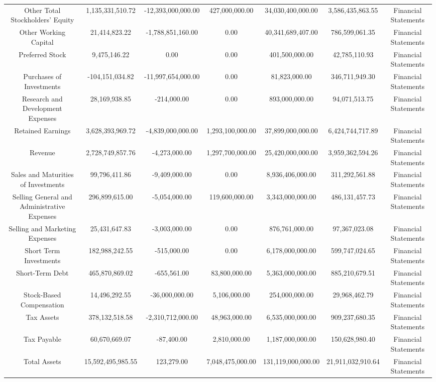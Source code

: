 \begin{longtable}{ccccccc}
Other Total Stockholders' Equity & 1,135,331,510.72 & -12,393,000,000.00 & 427,000,000.00 & 34,030,400,000.00 & 3,586,435,863.55 & Financial Statements \\
Other Working Capital & 21,414,823.22 & -1,788,851,160.00 & 0.00 & 40,341,689,407.00 & 786,599,061.35 & Financial Statements \\
Preferred Stock & 9,475,146.22 & 0.00 & 0.00 & 401,500,000.00 & 42,785,110.93 & Financial Statements \\
Purchases of Investments & -104,151,034.82 & -11,997,654,000.00 & 0.00 & 81,823,000.00 & 346,711,949.30 & Financial Statements \\
Research and Development Expenses & 28,169,938.85 & -214,000.00 & 0.00 & 893,000,000.00 & 94,071,513.75 & Financial Statements \\
Retained Earnings & 3,628,393,969.72 & -4,839,000,000.00 & 1,293,100,000.00 & 37,899,000,000.00 & 6,424,744,717.89 & Financial Statements \\
Revenue & 2,728,749,857.76 & -4,273,000.00 & 1,297,700,000.00 & 25,420,000,000.00 & 3,959,362,594.26 & Financial Statements \\
Sales and Maturities of Investments & 99,796,411.86 & -9,409,000.00 & 0.00 & 8,936,406,000.00 & 311,292,561.88 & Financial Statements \\
Selling General and Administrative Expenses & 296,899,615.00 & -5,054,000.00 & 119,600,000.00 & 3,343,000,000.00 & 486,131,457.73 & Financial Statements \\
Selling and Marketing Expenses & 25,431,647.83 & -3,003,000.00 & 0.00 & 876,761,000.00 & 97,367,023.08 & Financial Statements \\
Short Term Investments & 182,988,242.55 & -515,000.00 & 0.00 & 6,178,000,000.00 & 599,747,024.65 & Financial Statements \\
Short-Term Debt & 465,870,869.02 & -655,561.00 & 83,800,000.00 & 5,363,000,000.00 & 885,210,679.51 & Financial Statements \\
Stock-Based Compensation & 14,496,292.55 & -36,000,000.00 & 5,106,000.00 & 254,000,000.00 & 29,968,462.79 & Financial Statements \\
Tax Assets & 378,132,518.58 & -2,310,712,000.00 & 48,963,000.00 & 6,535,000,000.00 & 909,237,680.35 & Financial Statements \\
Tax Payable & 60,670,669.07 & -87,400.00 & 2,810,000.00 & 1,187,000,000.00 & 150,628,980.40 & Financial Statements \\
Total Assets & 15,592,495,985.55 & 123,279.00 & 7,048,475,000.00 & 131,119,000,000.00 & 21,911,032,910.64 & Financial Statements \\

\end{longtable}

